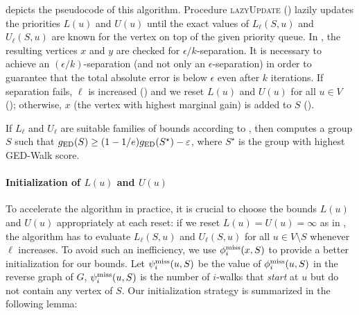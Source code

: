 

 depicts the pseudocode of this algorithm.
Procedure \textsc{lazyUpdate} () lazily updates
the priorities $L(u)$ and $U(u)$ until the exact values of
$L_{\ell}(S, u)$ and $U_{\ell}(S, u)$ are known for the vertex on top of
the given priority queue.
%
In , the resulting vertices $x$ and $y$
are checked for $\epsilon/k$-separation. It is necessary to achieve an
$(\epsilon/k)$-separation (and not only an $\epsilon$-separation)
in order to guarantee that the total absolute error is below $\epsilon$
even after $k$ iterations.
If separation fails, $\ell$ is increased ()
and we reset $L(u)$ and $U(u)$ for all $u \in V$ ();
otherwise, $x$ (\ie the vertex with highest marginal gain) is added to $S$
().

\begin{lemma}
\label{lemma:ged-walk:approx-bound}
If $L_{\ell}$ and $U_{\ell}$ are suitable families of bounds according to
, then  computes
a group $S$ such that $g_{\text{ED}}(S) \ge (1 - 1/e)g_{\text{ED}}(S^\star) - \varepsilon$,
where $S^\star$ is the group with highest GED-Walk score.
\end{lemma}

\paragraph{Initialization of $L(u)$ and $U(u)$}
%
To accelerate the algorithm in practice, it is crucial to choose
the bounds $L(u)$ and $U(u)$ appropriately at each reset: if we reset
$L(u) = U(u) = \infty$ as in , the algorithm
has to evaluate $L_{\ell}(S, u)$ and $U_{\ell}(S, u)$ for all
$u \in V \setminus S$ whenever $\ell$ increases.
To avoid such an inefficiency, we use $\phi^{\text{miss}}_i(x, S)$ to provide a
better initialization for our bounds.
%
Let $\psi^{\text{miss}}_i(u, S)$ be the value of $\phi^{\text{miss}}_i(u, S)$ in the reverse graph
of $G$, \ie $\psi^{\text{miss}}_i(u, S)$ is the number of $i$-walks that \emph{start}
at $u$ but do not contain any vertex of $S$.
%
Our initialization strategy is summarized in the following lemma:

